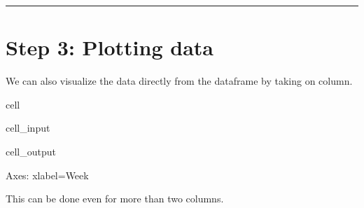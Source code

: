 \documentclass[letterpaper,10pt,english]{jupyterBook}
\begin{document}
\bigskip\hrule\bigskip



\section{Step 3: Plotting data}
\label{\detokenize{docs/Ex_Lecture_Demo_Inventory_Sim:step-3-plotting-data}}
\sphinxAtStartPar
We can also visualize the data directly from the dataframe by taking on column.

\begin{sphinxuseclass}{cell}\begin{sphinxVerbatimInput}

\begin{sphinxuseclass}{cell_input}
\begin{sphinxVerbatim}[commandchars=\\\{\}]
\PYG{p}{[}\PYG{p}{[}\PYG{p}{]}\PYG{p}{]}   
\end{sphinxVerbatim}

\end{sphinxuseclass}\end{sphinxVerbatimInput}
\begin{sphinxVerbatimOutput}

\begin{sphinxuseclass}{cell_output}
\begin{sphinxVerbatim}[commandchars=\\\{\}]
\PYGZlt{}Axes: xlabel=\PYGZsq{}Week\PYGZsq{}\PYGZgt{}
\end{sphinxVerbatim}

\noindent{}

\end{sphinxuseclass}\end{sphinxVerbatimOutput}

\end{sphinxuseclass}
\sphinxAtStartPar
This can be done even for more than two columns.
\end{document}
